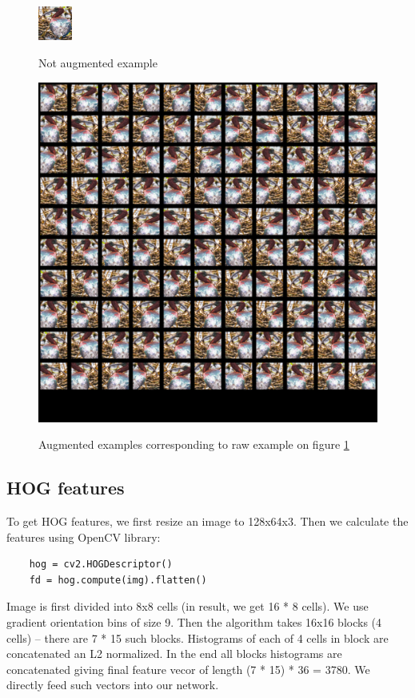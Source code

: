 \documentclass[a4paper]{article}
\begin{document}
\begin{figure}[h]
    \caption[]{Not augmented example}
    \centering
    \includegraphics[page=2,width=0.1\textwidth]{aug1.png}
    \label{fig:aug1}
\end{figure}

\begin{figure}[h]
    \caption[]{Augmented examples corresponding to raw example on figure \ref{fig:aug1}}
    \centering
    \includegraphics[page=2,width=1.0\textwidth]{aug2.png}
    \label{fig:aug2}
\end{figure}


\subsection{HOG features}
To get HOG features, we first resize an image to 128x64x3.
Then we calculate the features using OpenCV library:
\begin{verbatim}
    hog = cv2.HOGDescriptor()
    fd = hog.compute(img).flatten()
\end{verbatim}
Image is first divided into 8x8 cells (in result, we get 16 * 8 cells).
We use gradient orientation bins of size 9.
Then the algorithm takes 16x16 blocks (4 cells) --
there are 7 * 15 such blocks.
Histograms of each of 4 cells in block are concatenated an L2 normalized.
In the end all blocks histograms are concatenated giving
final feature vecor of length (7 * 15) * 36 = 3780.
We directly feed such vectors into our network.
\end{document}
